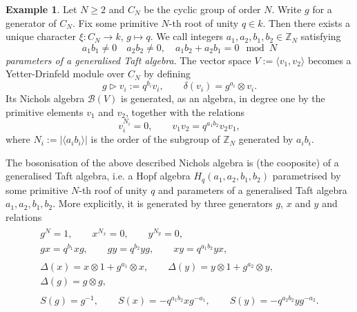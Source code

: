 \documentclass{amsart}
\theoremstyle{definition}
\newtheorem{example}{Example}
\begin{document}
	\begin{example}
		Let $N\geq 2 $ and $C_N$ be the cyclic group of order $N$. Write $g$ for a generator of $C_N$.
		Fix some primitive $N$-th root of unity $q\in k$. 
		Then there exists a unique character $\xi: C_N \rightarrow k$, $g \mapsto  q$.
		We call integers $a_1, a_2, b_1, b_2 \in \mathbb Z_N$ satisfying 
		$$
		a_1 b_1 \neq 0 \quad a_2 b_2 \neq 0 , \quad a_1 b_2 + a_2 b_1 = 0 \mod N
		$$
		\emph{parameters of a generalised Taft algebra}.
		The vector space $V:=\langle v_1, v_2\rangle$ becomes a Yetter-Drinfeld module over $C_N$ by defining 
		$$
		g\triangleright v_i := q^{b_i} v_i,\qquad \delta(v_i) = g^{a_i} \otimes v_i.
		$$
		Its Nichols algebra $\mathcal B(V)$ is generated, as an algebra, in degree one by the primitive elements $v_1$ and $v_2$, together with the relations
		$$
		v_i^{N_i} = 0, \qquad v_1 v_2 = q^{a_1b_2} v_2 v_1,
		$$ 
		where $N_i:=|\langle a_i b_i \rangle |$ is the order of the subgroup of $\mathbb Z_N$ generated by $a_i b_i$.

		The bosonisation of the above described Nichols algebra is (the cooposite) of a generalised Taft algebra, i.e. a Hopf algebra $H_q(a_1, a_2, b_1, b_2)$ parametrised by some primitive $N$-th roof of unity $q$  and parameters of a generalised Taft algebra $a_1, a_2, b_1, b_2$.
		More explicitly, it is generated by three generators $g$, $x$ and $y$ and relations
		\begin{gather}
		\begin{gathered} \label{eq:AlgRelations}
		g^N = 1, \qquad
		x^{N_x} = 0, \qquad
		y^{N_y} = 0,	
		\\
		gx = q^{b_1}xg, \qquad
		gy = q^{b_2}yg, \qquad
		xy = q^{a_1b_2} yx,
		\end{gathered}
		\\
		\begin{gathered}\label{eq:CoalgRelations}
		\Delta(x) = x \otimes 1 + g^{a_1} \otimes x,  \qquad
		\Delta(y) = y \otimes 1 + g^{a_2} \otimes y,
		\\
		\Delta(g) = g \otimes g , \;\;
		\end{gathered}
		\\
		\begin{gathered}\label{eq:AntipodeRelations}
		S(g) = g^{-1}, \qquad
		S(x) = - q^{a_1b_2}xg^{-a_1}, \qquad
		S(y) = - q^{a_2b_2}yg^{-a_2}.
		\end{gathered}
		\end{gather}		
	\end{example}
\end{document}
